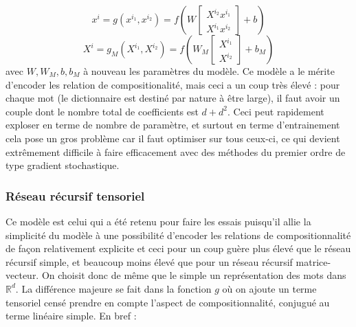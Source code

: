 \documentclass[conference]{IEEEtran}
\begin{document}
$$x^i=g(x^{i_1},x^{i_2})=f\left(W\begin{bmatrix} X^{i_2}x^{i_1} \\ X^{i_1}x^{i_2} \end{bmatrix}+b\right)$$
$$X^i=g_M(X^{i_1},X^{i_2})=f\left(W_M\begin{bmatrix} X^{i_1} \\ X^{i_2} \end{bmatrix}+b_M\right)$$
avec $W,W_M,b,b_M$ à nouveau les paramètres du modèle. Ce modèle a le mérite d'encoder les relation de compositionalité, mais ceci a un coup très élevé : pour chaque mot (le dictionnaire est destiné par nature à être large), il faut avoir un couple dont le nombre total de coefficients est $d+d^2$. Ceci peut rapidement exploser en terme de nombre de paramètre, et surtout en terme d'entrainement cela pose un gros problème car il faut optimiser sur tous ceux-ci, ce qui devient extrêmement difficile à faire efficacement avec des méthodes du premier ordre de type gradient stochastique.

\subsubsection{Réseau récursif tensoriel}
Ce modèle est celui qui a été retenu pour faire les essais puisqu'il allie la simplicité du modèle à une possibilité d'encoder les relations de compositionnalité de façon relativement explicite et ceci pour un coup guère plus élevé que le réseau récursif simple, et beaucoup moins élevé que pour un réseau récursif matrice-vecteur. On choisit donc de même que le simple un représentation des mots dans $\mathbb{R}^d$. La différence majeure se fait dans la fonction $g$ où on ajoute un terme tensoriel censé prendre en compte l'aspect de compositionnalité, conjugué au terme linéaire simple. En bref :
\end{document}
